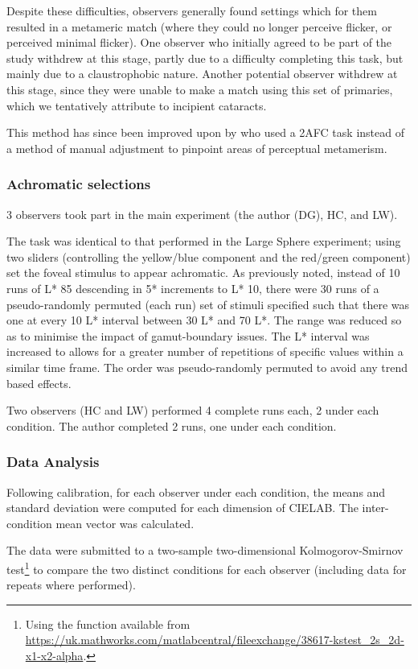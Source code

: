 Despite these difficulties, observers generally found settings which for them resulted in a metameric match (where they could no longer perceive flicker, or perceived minimal flicker). One observer who initially agreed to be part of the study withdrew at this stage, partly due to a difficulty completing this task, but mainly due to a claustrophobic nature. Another potential observer withdrew at this stage, since they were unable to make a match using this set of primaries, which we tentatively attribute to incipient cataracts.

This method has since been improved upon by \citet{allen_form_2019} who used a 2AFC task instead of a method of manual adjustment to pinpoint areas of perceptual metamerism.

\subsubsection{Achromatic selections}

3 observers took part in the main experiment (the author (DG), HC, and LW). 

The task was identical to that performed in the Large Sphere experiment; using two sliders (controlling the yellow/blue component and the red/green component) set the foveal stimulus to appear achromatic. As previously noted, instead of 10 runs of L* 85 descending in 5* increments to L* 10, there were 30 runs of a pseudo-randomly permuted (each run) set of stimuli specified such that there was one at every 10 L* interval between 30 L* and 70 L*. The range was reduced so as to minimise the impact of gamut-boundary issues. The L* interval was increased to allows for a greater number of repetitions of specific values within a similar time frame. The order was pseudo-randomly permuted to avoid any trend based effects.

Two observers (HC and LW) performed 4 complete runs each, 2 under each condition. The author completed 2 runs, one under each condition.

\subsubsection{Data Analysis}

Following calibration, for each observer under each condition, the means and standard deviation were computed for each dimension of CIELAB. The inter-condition mean vector was calculated.

The data were submitted to a two-sample two-dimensional Kolmogorov-Smirnov test\footnote{Using the function available from \url{https://uk.mathworks.com/matlabcentral/fileexchange/38617-kstest_2s_2d-x1-x2-alpha}.} to compare the two distinct conditions for each observer (including data for repeats where performed). 


